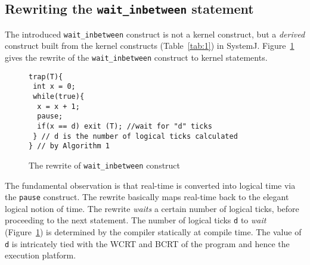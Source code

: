 
\subsection{Rewriting the \texttt{wait\_inbetween} statement}
\label{sec:rewr-delay-stat}

The introduced \texttt{wait\_inbetween} construct is not a kernel
construct, but a \textit{derived} construct built from the kernel
constructs (Table~\ref{tab:1}) in SystemJ. Figure~\ref{fig:3} gives the
rewrite of the \texttt{wait\_inbetween} construct to kernel statements.

\begin{figure}[tb]
	\vspace{-10pt}
    \begin{minipage}{\textwidth}
      \begin{lstlisting}[style=sysj,morekeywords={abort,await,emit,present,trap,pause,exit,delay,suspend}]
trap(T){
 int x = 0;
 while(true){
  x = x + 1;
  pause;
  if(x == d) exit (T); //wait for "d" ticks
 } // d is the number of logical ticks calculated
} // by Algorithm 1
\end{lstlisting}
    \end{minipage}
    \caption{The rewrite of \texttt{wait\_inbetween} construct}
    \label{fig:3}
\end{figure}

The fundamental observation is that real-time is converted into logical
time via the \texttt{pause} construct. The rewrite basically maps
real-time back to the elegant logical notion of time. The rewrite
\textit{waits} a certain number of logical ticks, before proceeding to
the next statement. The number of logical ticks \texttt{d} to
\textit{wait} (Figure~\ref{fig:3}) is determined by the compiler
statically at compile time. The value of \texttt{d} is intricately tied
with the WCRT and BCRT of the program and hence the execution platform.

